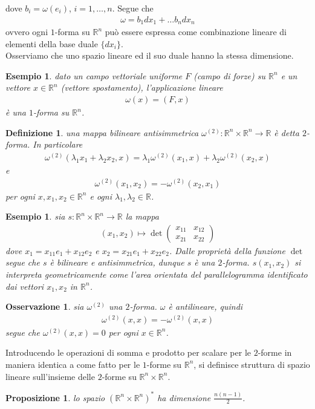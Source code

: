 \documentclass[twoside, 11pt]{amsbook}
\newcommand{\0}{{(0)}}
\newcommand{\3}{{(3)}}
\theoremstyle{colonplain}
\newtheorem{prop}[thm]{Proposizione}
\theoremstyle{colondefinition}
\newtheorem{defn}[thm]{Definizione}
\newtheorem{ex}[thm]{Esempio}
\theoremstyle{colonremark}
\newtheorem{rmk}[thm]{Osservazione}
\numberwithin{equation}{chapter}
\begin{document}
dove $b_i = \omega(e_i)$, $i = 1, \dots, n$. Segue che 
\begin{align}
    \omega = b_1dx_1 + \dots b_ndx_n 
\end{align}
ovvero ogni $1$-forma su $\mathbb{R}^n$ può essere espressa come combinazione lineare di elementi della base duale $\{dx_i\}$. \\
Osserviamo che uno spazio lineare ed il suo duale hanno la stessa dimensione.
\begin{ex} dato un campo vettoriale uniforme $F$ (campo di forze) su $\mathbb{R}^n$ e un vettore $x \in \mathbb{R}^n$ (vettore spostamento), l'applicazione lineare 
\begin{align}
    \omega(x) = (F, x) 
\end{align}
è una $1$-forma su $\mathbb{R}^n$.
\end{ex}
\begin{defn} una mappa bilineare antisimmetrica $\omega^{(2)} : \mathbb{R}^n \times \mathbb{R}^n \longrightarrow \mathbb{R}$ è detta $2$-\textit{forma}. In particolare 
\begin{align}
    \omega^{(2)}(\lambda_1x_1 + \lambda_2x_2, x) = \lambda_1\omega^{(2)}(x_1, x) + \lambda_2\omega^{(2)}(x_2, x) 
\end{align}
e
\begin{align}
    \omega^{(2)}(x_1, x_2) = -\omega^{(2)}(x_2, x_1)  
\end{align}
per ogni $x, x_1, x_2 \in \mathbb{R}^n$ e ogni $\lambda_1, \lambda_2 \in \mathbb{R}$.
\end{defn}
\begin{ex} sia $s : \mathbb{R}^n \times \mathbb{R}^n \longrightarrow \mathbb{R}$ la mappa 
\begin{align}
    (x_1, x_2) \mapsto \det
    \begin{pmatrix}
        x_{11} & x_{12} \\
        x_{21} & x_{22}
    \end{pmatrix} 
\end{align}
dove $x_1 = x_{11}e_1 + x_{12}e_2$ e $x_2 = x_{21}e_1 + x_{22}e_2$. Dalle proprietà della funzione $\det$ segue che $s$ è bilineare e antisimmetrica, dunque $s$ è una $2$-forma. $s(x_1, x_2)$ si interpreta geometricamente come l'area orientata del parallelogramma identificato dai vettori $x_1, x_2$ in $\mathbb{R}^n$.
\end{ex}
\begin{rmk} sia $\omega^{(2)}$ una $2$-forma. $\omega$ è antilineare, quindi
\begin{align}
    \omega^{(2)}(x, x) = -\omega^{(2)}(x, x)
\end{align}
segue che $\omega^{(2)}(x, x) = 0$ per ogni $x \in \mathbb{R}^n$.
\end{rmk}
Introducendo le operazioni di somma e prodotto per scalare per le $2$-forme in maniera identica a come fatto per le $1$-forme su $\mathbb{R}^n$, si definisce struttura di spazio lineare sull'insieme delle $2$-forme su $\mathbb{R}^n \times \mathbb{R}^n$.
\begin{prop}\label{R^n x R^n DualDim} lo spazio $(\mathbb{R}^n \times \mathbb{R}^n)^*$ ha dimensione $\frac{n(n - 1)}{2}$.
\end{prop}
\end{document}
